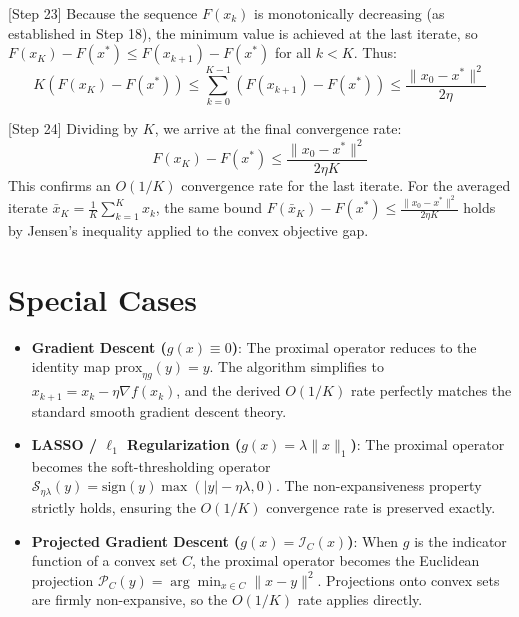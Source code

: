 \documentclass{article}
\begin{document}
[Step 23] Because the sequence $F(x_k)$ is monotonically decreasing (as established in Step 18), the minimum value is achieved at the last iterate, so $F(x_K) - F(x^*) \leq F(x_{k+1}) - F(x^*)$ for all $k < K$. Thus:
\begin{equation}
    K \left( F(x_K) - F(x^*) \right) \leq \sum_{k=0}^{K-1} \left( F(x_{k+1}) - F(x^*) \right) \leq \frac{\|x_0 - x^*\|^2}{2\eta}
\end{equation}

[Step 24] Dividing by $K$, we arrive at the final convergence rate:
\begin{equation}
    F(x_K) - F(x^*) \leq \frac{\|x_0 - x^*\|^2}{2 \eta K}
\end{equation}
This confirms an $O(1/K)$ convergence rate for the last iterate. For the averaged iterate $\bar{x}_K = \frac{1}{K}\sum_{k=1}^K x_k$, the same bound $F(\bar{x}_K) - F(x^*) \leq \frac{\|x_0 - x^*\|^2}{2 \eta K}$ holds by Jensen's inequality applied to the convex objective gap.

\section*{Special Cases}
\begin{itemize}
    \item \textbf{Gradient Descent ($g(x) \equiv 0$)}: The proximal operator reduces to the identity map $\text{prox}_{\eta g}(y) = y$. The algorithm simplifies to $x_{k+1} = x_k - \eta \nabla f(x_k)$, and the derived $O(1/K)$ rate perfectly matches the standard smooth gradient descent theory.
    \item \textbf{LASSO / $\ell_1$ Regularization ($g(x) = \lambda \|x\|_1$)}: The proximal operator becomes the soft-thresholding operator $\mathcal{S}_{\eta \lambda}(y) = \text{sign}(y) \max(|y| - \eta \lambda, 0)$. The non-expansiveness property strictly holds, ensuring the $O(1/K)$ convergence rate is preserved exactly.
    \item \textbf{Projected Gradient Descent ($g(x) = \mathcal{I}_C(x)$)}: When $g$ is the indicator function of a convex set $C$, the proximal operator becomes the Euclidean projection $\mathcal{P}_C(y) = \arg\min_{x \in C} \|x - y\|^2$. Projections onto convex sets are firmly non-expansive, so the $O(1/K)$ rate applies directly.
\end{itemize}
\end{document}
